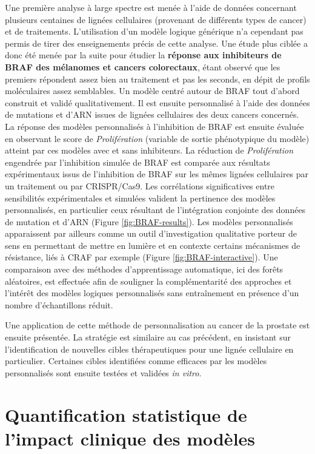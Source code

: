 \documentclass[a4paper,12pt,twoside,onecolumn,openright,final,oldfontcommands]{memoir}
\begin{document}
Une première analyse à large spectre est menée à l'aide de données
concernant plusieurs centaines de lignées cellulaires (provenant de
différents types de cancer) et de traitements. L'utilisation d'un modèle
logique générique n'a cependant pas permis de tirer des enseignements
précis de cette analyse. Une étude plus ciblée a donc été menée par la
suite pour étudier la \textbf{réponse aux inhibiteurs de BRAF des
mélanomes et cancers colorectaux}, étant observé que les premiers
répondent assez bien au traitement et pas les seconds, en dépit de
profils moléculaires assez semblables. Un modèle centré autour de BRAF
tout d'abord construit et validé qualitativement. Il est ensuite
personnalisé à l'aide des données de mutations et d'ARN issues de
lignées cellulaires des deux cancers concernés. La réponse des modèles
personnalisés à l'inhibition de BRAF est ensuite évaluée en observant le
score de \emph{Prolifération} (variable de sortie phénotypique du
modèle) atteint par ces modèles avec et sans inhibiteurs. La réduction
de \emph{Prolifération} engendrée par l'inhibition simulée de BRAF est
comparée aux résultats expérimentaux issus de l'inhibition de BRAF sur
les mêmes lignées cellulaires par un traitement ou par CRISPR/Cas9. Les
corrélations significatives entre sensibilités expérimentales et
simulées valident la pertinence des modèles personnalisés, en
particulier ceux résultant de l'intégration conjointe des données de
mutation et d'ARN (Figure \ref{fig:BRAF-results}). Les modèles
personnalisés apparaissent par ailleurs comme un outil d'investigation
qualitative porteur de sens en permettant de mettre en lumière et en
contexte certains mécanismes de résistance, liés à CRAF par exemple
(Figure \ref{fig:BRAF-interactive}). Une comparaison avec des méthodes
d'apprentissage automatique, ici des forêts aléatoires, est effectuée
afin de souligner la complémentarité des approches et l'intérêt des
modèles logiques personnalisés sans entraînement en présence d'un nombre
d'échantillons réduit.

Une application de cette méthode de personnalisation au cancer de la
prostate est ensuite présentée. La stratégie est similaire au cas
précédent, en insistant sur l'identification de nouvelles cibles
thérapeutiques pour une lignée cellulaire en particulier. Certaines
cibles identifiées comme efficaces par les modèles personnalisés sont
ensuite testées et validées \emph{in vitro}.

\section{Quantification statistique de l'impact clinique des
modèles}\label{quantification-statistique-de-limpact-clinique-des-moduxe8les}
\end{document}
